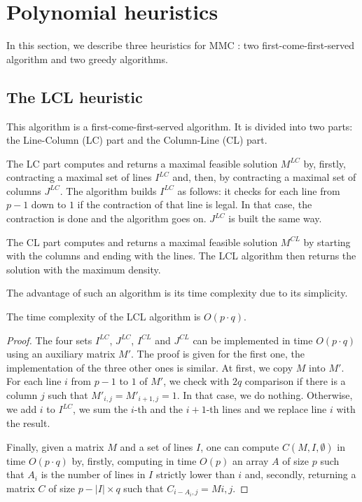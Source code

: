 
\section{Polynomial heuristics}
\label{sect:heuristics}

In this section, we describe three heuristics for MMC : two first-come-first-served algorithm and two greedy algorithms.

\subsection{The LCL heuristic}

This algorithm is a first-come-first-served algorithm. It is divided into two parts: the Line-Column (LC) part and the Column-Line (CL) part. 

The LC part computes and returns a maximal feasible solution $M^{LC}$ by, firstly, contracting a maximal set of lines $I^{LC}$ and, then, by contracting a maximal set of columns $J^{LC}$. The algorithm builds $I^{LC}$ as follows: it checks for each line from $p-1$ down to $1$ if the contraction of that line is legal. In that case, the contraction is done and the algorithm goes on. $J^{LC}$ is built the same way.

The CL part computes and returns a maximal feasible solution $M^{CL}$ by starting with the columns and ending with the lines. The LCL algorithm then returns the solution with the maximum density.

The advantage of such an algorithm is its time complexity due to its simplicity.

\begin{theorem}
	The time complexity of the LCL algorithm is $O(p \cdot q)$. 
\end{theorem}
\begin{proof}
	The four sets $I^{LC}$, $J^{LC}$, $I^{CL}$ and $J^{CL}$ can be implemented in time $O(p \cdot q)$ using an auxiliary matrix $M'$. The proof is given for the first one, the implementation of the three other ones is similar. At first, we copy $M$ into $M'$. For each line $i$ from $p-1$ to $1$ of $M'$, we check with $2q$ comparison if there is a column $j$ such that $M'_{i,j} = M'_{i+1,j} = 1$. In that case, we do nothing. Otherwise, we add $i$ to $I^{LC}$, we sum the $i$-th and the $i+1$-th lines and we replace line $i$ with the result.
	
	Finally, given a matrix $M$ and a set of lines $I$, one can compute $C(M,I,\emptyset)$ in time $O(p \cdot q)$ by, firstly, computing in time $O(p)$ an array $A$ of size $p$ such that $A_i$ is the number of lines in $I$ strictly lower than $i$ and, secondly, returning a matrix $C$ of size $p - |I| \times q$ such that $C_{i-A_i,j} = M{i,j}$.
\end{proof}

